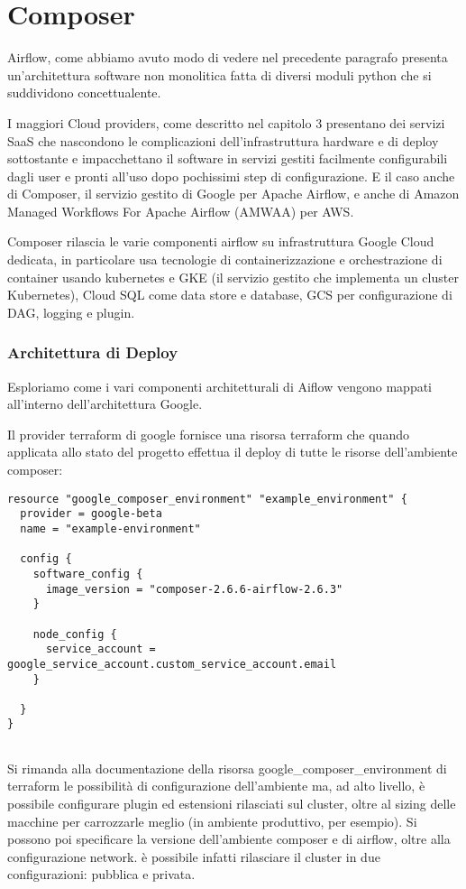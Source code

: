 \documentclass[a4paper,12pt]{report}
\begin{document}
\section{Composer}
Airflow, come abbiamo avuto modo di vedere nel precedente paragrafo presenta un’architettura software non monolitica fatta di diversi moduli python che si suddividono  concettualente.

I maggiori Cloud providers, come descritto nel capitolo 3 presentano dei servizi SaaS che nascondono le complicazioni dell’infrastruttura hardware e di deploy sottostante e impacchettano il software in servizi gestiti facilmente configurabili dagli user e pronti all’uso dopo pochissimi step di configurazione. E il caso anche di Composer, il servizio gestito di Google per Apache Airflow, e anche di Amazon Managed Workflows For Apache Airflow (AMWAA) per AWS.

Composer rilascia le varie componenti airflow su infrastruttura Google Cloud dedicata, in particolare usa tecnologie di containerizzazione e orchestrazione di container usando kubernetes e GKE (il servizio gestito che implementa un cluster Kubernetes), Cloud SQL come data store e database, GCS per configurazione di DAG, logging e plugin.


\subsubsection{Architettura di Deploy}
Esploriamo come i vari componenti architetturali di Aiflow vengono mappati all’interno dell’architettura Google.

Il provider terraform di google fornisce una risorsa terraform che quando applicata allo stato del progetto effettua il deploy di tutte le risorse dell’ambiente composer:

\begin{verbatim} 
resource "google_composer_environment" "example_environment" {
  provider = google-beta
  name = "example-environment"

  config {
    software_config {
      image_version = "composer-2.6.6-airflow-2.6.3"
    }

    node_config {
      service_account = google_service_account.custom_service_account.email
    }

  }
}


\end{verbatim}

Si rimanda alla documentazione della risorsa google\_composer\_environment di terraform le possibilità di configurazione dell’ambiente ma, ad alto livello, è possibile configurare plugin ed estensioni rilasciati sul cluster, oltre al sizing delle macchine per carrozzarle meglio (in ambiente produttivo, per esempio). Si possono poi specificare la versione dell’ambiente composer e di airflow, oltre alla configurazione network. è possibile infatti rilasciare il cluster in due configurazioni: pubblica e privata.
\end{document}
